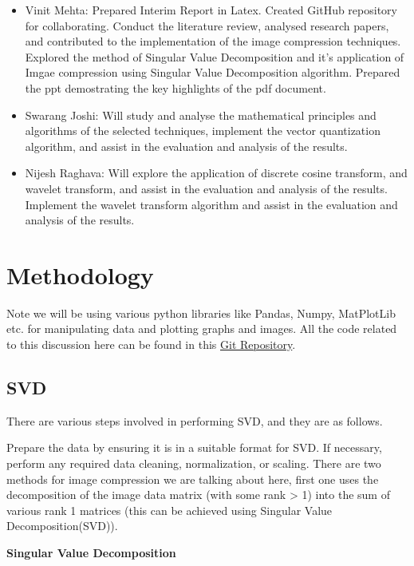 \documentclass{article}
\begin{document}
\begin{itemize}
    \item Vinit Mehta: Prepared Interim Report in Latex. Created GitHub repository for collaborating. Conduct the literature review, analysed research papers, and contributed to the implementation of the image compression techniques. Explored the method of Singular Value Decomposition and it's application of Imgae compression using Singular Value Decomposition algorithm. Prepared the ppt demostrating the key highlights of the pdf document.
    \item Swarang Joshi: Will study and analyse the mathematical principles and algorithms of the selected techniques, implement the vector quantization algorithm, and assist in the evaluation and analysis of the results.
    \item Nijesh Raghava: Will explore the application of discrete cosine transform, and wavelet transform, and assist in the evaluation and analysis of the results. Implement the wavelet transform algorithm and assist in the evaluation and analysis of the results.
\end{itemize}

\section{Methodology}
Note we will be using various python libraries like Pandas, Numpy, MatPlotLib etc. for manipulating data and plotting graphs and images. All the code related to this discussion here can be found in this \href{https://github.com/Vinit2244/LA-Project-25.git}{Git Repository}.
\subsection{SVD}

There are various steps involved in performing SVD, and they are as follows.

Prepare the data by ensuring it is in a suitable format for SVD. If necessary, perform any required data cleaning, normalization, or scaling. There are two methods for image compression we are talking about here, first one uses the decomposition of the image data matrix (with some rank \textgreater{} 1) into the sum of various rank 1 matrices (this can be achieved using Singular Value Decomposition(SVD)).\\

\begin{center}
  \large\textbf{Singular Value Decomposition}
\end{center}
\end{document}
